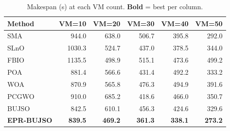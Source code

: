 \documentclass[journal]{IEEEtran}
\begin{document}
\begin{samepage}
\begin{table}
\centering
\caption{Makespan (s) at each VM count. \textbf{Bold} = best per column.}
\label{tab:makespan_raw}
\small
\begin{tabular}{lrrrrr}
\toprule
\textbf{Method} & \textbf{VM=10} & \textbf{VM=20} & \textbf{VM=30}
               & \textbf{VM=40} & \textbf{VM=50}\\
\midrule
SMA             &  944.0 &  638.0 &  506.7 &  395.8 &  292.0\\
SLnO            & 1030.3 &  524.7 &  437.0 &  378.5 &  344.0\\
FBIO            & 1135.5 &  498.9 &  515.1 &  473.6 &  499.2\\
POA             &  881.4 &  566.6 &  431.4 &  492.2 &  333.2\\
WOA             &  870.9 &  565.8 &  476.3 &  494.9 &  391.6\\
PCGWO           &  910.0 &  685.2 &  418.6 &  466.0 &  350.7\\
BUJSO           &  842.5 &  610.1 &  456.3 &  424.6 &  329.6\\
\textbf{EPR-BUJSO} & \textbf{839.5} & \textbf{469.2}
                   & \textbf{361.3} & \textbf{338.1} & \textbf{273.2}\\
\bottomrule
\end{tabular}
\end{table}



\begin{table}


\end{table}
\end{samepage}
\end{document}

